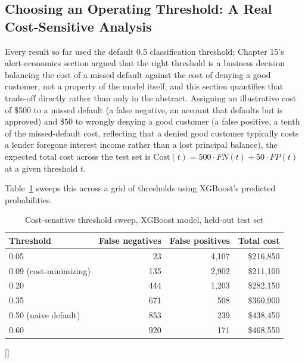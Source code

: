 \documentclass[../ai_in_finance]{subfiles}
\begin{document}
\subsection{Choosing an Operating Threshold: A Real Cost-Sensitive Analysis}
\label{sec:capstone-threshold}

Every result so far used the default 0.5 classification threshold; Chapter 15's alert-economics section argued that the right threshold is a business decision balancing the cost of a missed default against the cost of denying a good customer, not a property of the model itself, and this section quantifies that trade-off directly rather than only in the abstract. Assigning an illustrative cost of \$500 to a missed default (a false negative, an account that defaults but is approved) and \$50 to wrongly denying a good customer (a false positive, a tenth of the missed-default cost, reflecting that a denied good customer typically costs a lender foregone interest income rather than a lost principal balance), the expected total cost across the test set is $\text{Cost}(t) = 500 \cdot FN(t) + 50 \cdot FP(t)$ at a given threshold $t$.

Table~\ref{tab:capstone_threshold} sweeps this across a grid of thresholds using XGBoost's predicted probabilities.

\begin{table}[htbp]
\centering
\begin{lrbox}{\bookmeasuredbox}
\begin{tabular}{lrrr}
\toprule
Threshold & False negatives & False positives & Total cost \\
\midrule
0.05 & 23 & 4{,}107 & \$216{,}850 \\
0.09 (cost-minimizing) & 135 & 2{,}902 & \$211{,}100 \\
0.20 & 444 & 1{,}203 & \$282{,}150 \\
0.35 & 671 & 508 & \$360{,}900 \\
0.50 (naive default) & 853 & 239 & \$438{,}450 \\
0.60 & 920 & 171 & \$468{,}550 \\
\bottomrule
\end{tabular}
\end{lrbox}
\ifdim\wd\bookmeasuredbox<0.65\linewidth
\setlength{\bookcapwidth}{0.65\linewidth}
\else
\setlength{\bookcapwidth}{\wd\bookmeasuredbox}
\fi
{}[\bookcapwidth]{
\usebox{\bookmeasuredbox}
}{
\caption{Cost-sensitive threshold sweep, XGBoost model, held-out test set}
\label{tab:capstone_threshold}
}
\end{table}
\end{document}
